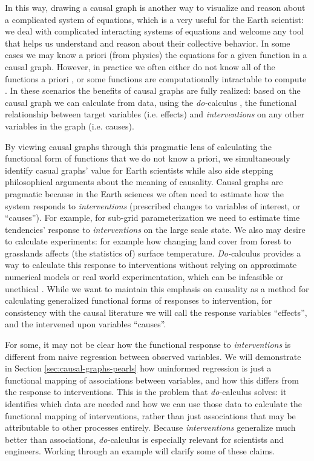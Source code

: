 \documentclass[12pt]{article}
\begin{document}
In this way, drawing a causal graph is another way to visualize and
reason about a complicated system of equations, which is a very useful
for the Earth scientist: we deal with complicated interacting systems
of equations and welcome any tool that helps us understand and reason
about their collective behavior. In some cases we may know a priori
(from physics) the equations for a given function in a causal
graph. However, in practice we often either do not know all of the
functions a priori \citep[e.g., plant stomata response to
VPD;][]{massmann2019}, or some functions are computationally
intractable to compute \citep[e.g., turbulence, moist convection, and
cloud microphysics in large scale models;][]{zadra2018}. In these
scenarios the benefits of causal graphs are fully realized: based on
the causal graph we can calculate from data, using the
\textit{do-}calculus \citep{pearl-1994-do-calculus}, the functional
relationship between target variables (i.e. effects) and \textit{interventions}
on any other variables in the graph (i.e. causes).

By viewing causal graphs through this pragmatic lens of calculating
the functional form of functions that we do not know a priori, we
simultaneously identify casual graphs' value for Earth scientists
while also side stepping philosophical arguments about the meaning of
causality. Causal graphs are pragmatic because in the Earth sciences
we often need to estimate how the system responds to
\emph{interventions} (prescribed changes to variables of interest, or
``causes''). For example, for sub-grid parameterization we need to
estimate time tendencies' response to \emph{interventions} on the
large scale state. We also may desire to calculate experiments: for
example how changing land cover from forest to grasslands affects (the
statistics of) surface temperature. \textit{Do-}calculus provides a
way to calculate this response to interventions without relying on
approximate numerical models or real world experimentation, which can
be infeasible or unethical \citep[as is the case for geoengineering
and unilateral decisions to seed the oceans with iron, or spray
aerosols in the atmosphere; e.g.,][]{hamilton2013no}. While we want to
maintain this emphasis on causality as a method for calculating
generalized functional forms of responses to intervention, for
consistency with the causal literature we will call the response
variables ``effects'', and the intervened upon variables ``causes''.

For some, it may not be clear how the functional response to
\emph{interventions} is different from naive regression between
observed variables. We will demonstrate in Section
\ref{sec:causal-graphs-pearls} how uninformed regression is just a
functional mapping of associations between variables, and how this
differs from the response to interventions. This is the problem that
\textit{do-}calculus solves: it identifies which data are needed and
how we can use those data to calculate the functional mapping of
interventions, rather than just associations that may be attributable
to other processes entirely. Because \emph{interventions} generalize
much better than associations, \textit{do-}calculus is especially
relevant for scientists and engineers. Working through an example will
clarify some of these claims.
\end{document}
